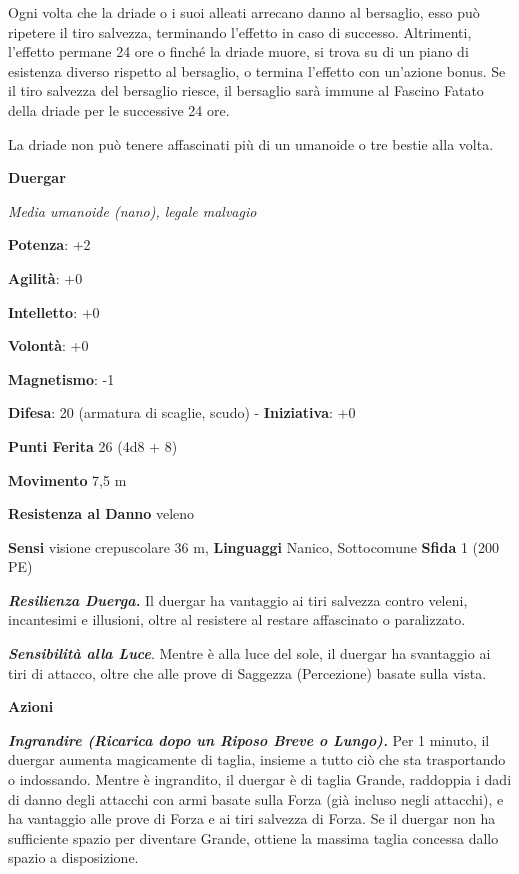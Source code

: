 \begin{multicols}{2}
Ogni volta che la driade o i suoi alleati arrecano danno al bersaglio,
esso può ripetere il tiro salvezza, terminando l'effetto in caso di
successo. Altrimenti, l'effetto permane 24 ore o finché la driade muore,
si trova su di un piano di esistenza diverso rispetto al bersaglio, o
termina l'effetto con un'azione bonus. Se il tiro salvezza del bersaglio
riesce, il bersaglio sarà immune al Fascino Fatato della driade per le
successive 24 ore.

La driade non può tenere affascinati più di un umanoide o tre bestie
alla volta.

\textbf{Duergar}

\emph{Media umanoide (nano), legale malvagio}

\textbf{Potenza}: +2

\textbf{Agilità}: +0

\textbf{Intelletto}: +0

\textbf{Volontà}: +0

\textbf{Magnetismo}: -1

\textbf{Difesa}: 20 (armatura di scaglie, scudo) - \textbf{Iniziativa}: +0

\textbf{Punti Ferita} 26 (4d8 + 8)

\textbf{Movimento} 7,5 m

\textbf{Resistenza al Danno} veleno

\textbf{Sensi} visione crepuscolare 36 m, 
\textbf{Linguaggi} Nanico, Sottocomune \textbf{Sfida} 1 (200 PE)\smallskip

\emph{\textbf{Resilienza Duerga.}} Il duergar ha vantaggio ai tiri
salvezza contro veleni, incantesimi e illusioni, oltre al resistere al
restare affascinato o paralizzato.

\emph{\textbf{Sensibilità alla Luce}}. Mentre è alla luce del sole, il
duergar ha svantaggio ai tiri di attacco, oltre che alle prove di
Saggezza (Percezione) basate sulla vista.

\smallskip\textbf{Azioni}

\emph{\textbf{Ingrandire (Ricarica dopo un Riposo Breve o Lungo).}} Per
1 minuto, il duergar aumenta magicamente di taglia, insieme a tutto ciò
che sta trasportando o indossando. Mentre è ingrandito, il duergar è di
taglia Grande, raddoppia i dadi di danno degli attacchi con armi basate
sulla Forza (già incluso negli attacchi), e ha vantaggio alle prove di
Forza e ai tiri salvezza di Forza. Se il duergar non ha sufficiente
spazio per diventare Grande, ottiene la massima taglia concessa dallo
spazio a disposizione.


\end{multicols}
